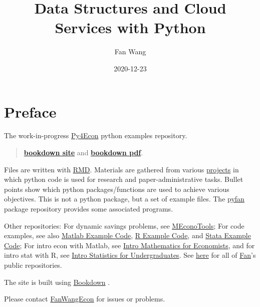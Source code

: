 \documentclass[
]{book}
\title{Data Structures and Cloud Services with Python}
\author{Fan Wang}
\date{2020-12-23}
\begin{document}
\maketitle

{
\hypersetup{linkcolor=}
\setcounter{tocdepth}{2}
\tableofcontents
}
\hypertarget{preface}{%
\chapter*{Preface}\label{preface}}

The work-in-progress \href{https://github.com/FanWangEcon/Py4Econ}{Py4Econ} python examples repository.

\begin{quote}
\href{https://fanwangecon.github.io/Py4Econ/bookdown}{\textbf{bookdown site}} and \href{https://fanwangecon.github.io/Py4Econ/bookdown/Data-Structures-and-Cloud-Services-with-Python.pdf}{\textbf{bookdown pdf}}.
\end{quote}

Files are written with \href{https://rmarkdown.rstudio.com/}{RMD}. Materials are gathered from various \href{https://fanwangecon.github.io/research}{projects} in which python code is used for research and paper-administrative tasks. Bullet points show which python packages/functions are used to achieve various objectives. This is not a python package, but a set of example files. The \href{https://pyfan.readthedocs.io/en/latest/}{pyfan} package repository provides some associated programs.

Other repositories: For dynamic savings problems, see \href{https://fanwangecon.github.io/MEconTools/}{MEconoTools}; For code examples, see also \href{https://fanwangecon.github.io/M4Econ/}{Matlab Example Code}, \href{https://fanwangecon.github.io/R4Econ/}{R Example Code}, and \href{https://fanwangecon.github.io/Stata4Econ/}{Stata Example Code}; For intro econ with Matlab, see \href{https://fanwangecon.github.io/Math4Econ/}{Intro Mathematics for Economists}, and for intro stat with R, see \href{https://fanwangecon.github.io/Stat4Econ/}{Intro Statistics for Undergraduates}. See \href{https://github.com/FanWangEcon}{here} for all of \href{https://fanwangecon.github.io/}{Fan}'s public repositories.

The site is built using \href{https://bookdown.org/}{Bookdown} \citep{R-bookdown}.

Please contact \href{https://fanwangecon.github.io/}{FanWangEcon} for issues or problems.
\end{document}

